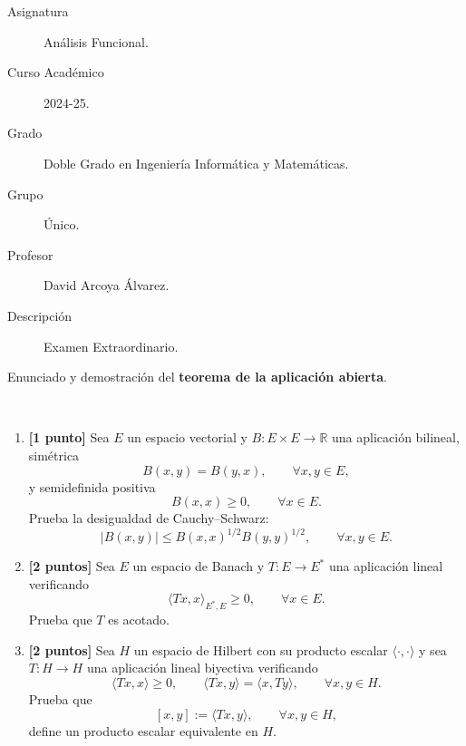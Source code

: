 \documentclass[12pt]{article}
\begin{document}

    

    \begin{description}
        \item[Asignatura] Análisis Funcional.
        \item[Curso Académico] 2024-25.
        \item[Grado] Doble Grado en Ingeniería Informática y Matemáticas.
        \item[Grupo] Único.
        \item[Profesor] David Arcoya Álvarez.
        \item[Descripción] Examen Extraordinario.
    
    \end{description}
    \newpage


    
    \begin{ejercicio}[2 puntos]
Enunciado y demostración del \textbf{teorema de la aplicación abierta}.
    \end{ejercicio}
    
    \begin{ejercicio}[5 puntos]~
    \begin{enumerate}
    \item \textbf{[1 punto]}  
    Sea $E$ un espacio vectorial y $B : E \times E \to \mathbb{R}$ una aplicación bilineal,
    simétrica
    \[
    B(x,y)=B(y,x), \qquad \forall x,y\in E,
    \]
    y semidefinida positiva
    \[
    B(x,x)\ge 0, \qquad \forall x\in E.
    \]
    Prueba la desigualdad de Cauchy--Schwarz:
    \[
    |B(x,y)| \le B(x,x)^{1/2} B(y,y)^{1/2},
    \qquad \forall x,y\in E.
    \]
    
    \item \textbf{[2 puntos]}  
    Sea $E$ un espacio de Banach y $T : E \to E^\ast$ una aplicación lineal verificando
    \[
    \langle Tx,x\rangle_{E^\ast,E} \ge 0,
    \qquad \forall x\in E.
    \]
    Prueba que $T$ es acotado.
    
    \item \textbf{[2 puntos]}  
    Sea $H$ un espacio de Hilbert con su producto escalar $\langle\cdot,\cdot\rangle$
    y sea $T : H \to H$ una aplicación lineal biyectiva verificando
    \[
    \langle Tx,x\rangle \ge 0,
    \qquad
    \langle Tx,y\rangle = \langle x,Ty\rangle,
    \qquad \forall x,y\in H.
    \]
    Prueba que
    \[
    [x,y] := \langle Tx,y\rangle,
    \qquad \forall x,y\in H,
    \]
    define un producto escalar equivalente en $H$.
    \end{enumerate}
    \end{ejercicio}
    
\end{document}
